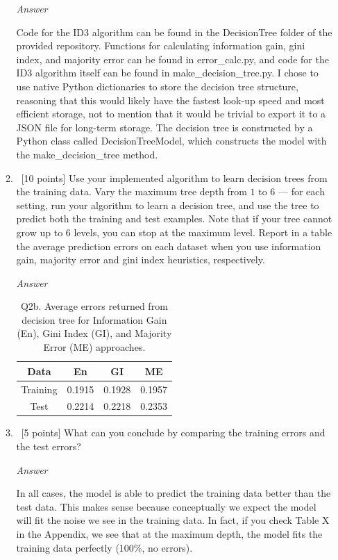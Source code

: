 \documentclass[12pt, fullpage,letterpaper]{article}
\begin{document}
\begin{enumerate}
\begin{enumerate}
\emph{Answer}

Code for the ID3 algorithm can be found in the DecisionTree folder of the provided repository. Functions for calculating information gain, gini index, and majority error can be found in error\_calc.py, and code for the ID3 algorithm itself can be found in make\_decision\_tree.py. I chose to use native Python dictionaries to store the decision tree structure, reasoning that this would likely have the fastest look-up speed and most efficient storage, not to mention that it would be trivial to export it to a JSON file for long-term storage. The decision tree is constructed by a Python class called DecisionTreeModel, which constructs the model with the make\_decision\_tree method.

\item~[10 points] Use your implemented algorithm to learn decision trees from the training data. Vary the maximum  tree depth from $1$ to $6$  --- for each setting, run your algorithm to learn a decision tree, and use the tree to  predict both the training  and test examples. Note that if your tree cannot grow up to 6 levels, you can stop at the maximum level. Report in a table the average prediction errors on each dataset when you use information gain, majority error and gini index heuristics, respectively.

\emph{Answer}

\begin{table}[h]
	\centering
	\begin{tabular}{c|ccc}
		Data & En & GI & ME \\ 
		\hline\hline
		Training &  0.1915 & 0.1928 & 0.1957 \\ \hline
		Test &  0.2214 & 0.2218 & 0.2353 \\ \hline
	\end{tabular}
	\caption{Q2b. Average errors returned from decision tree for Information Gain (En), Gini Index (GI), and Majority Error (ME) approaches.}
\end{table}

\item~[5 points] What can you conclude by comparing the training errors and the test errors?

\emph{Answer}

In all cases, the model is able to predict the training data better than the test data. This makes sense because conceptually we expect the model will fit the noise we see in the training data. In fact, if you check Table X in the Appendix, we see that at the maximum depth, the model fits the training data perfectly (100\%, no errors).


\end{enumerate}
\end{enumerate}
\end{document}
